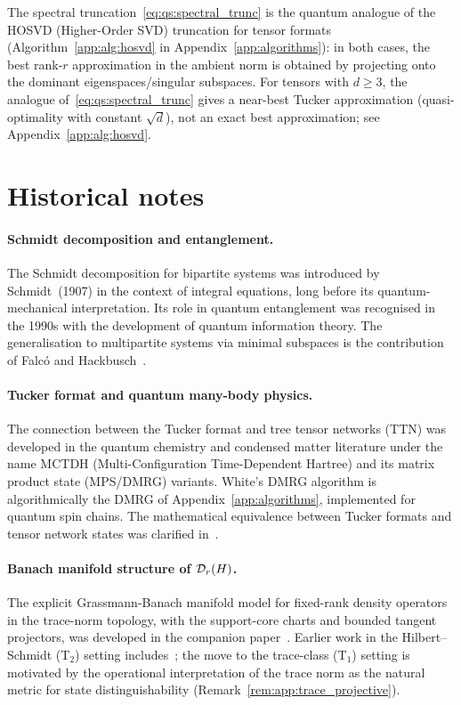 \begin{remark}
\label{rem:qs:ky_fan}
The spectral truncation~\eqref{eq:qs:spectral_trunc} is the quantum
analogue of the HOSVD (Higher-Order SVD) truncation for tensor formats
(Algorithm~\ref{app:alg:hosvd} in Appendix~\ref{app:algorithms}):
in both cases, the best rank-$r$ approximation in the ambient norm is
obtained by projecting onto the dominant eigenspaces/singular subspaces.
For tensors with $d \geq 3$, the analogue of~\eqref{eq:qs:spectral_trunc}
gives a near-best Tucker approximation (quasi-optimality with
constant $\sqrt{d}$), not an exact best approximation; see
Appendix~\ref{app:alg:hosvd}.
\end{remark}

\section{Historical notes}
\label{sec:qs:history}

\paragraph{Schmidt decomposition and entanglement.}
The Schmidt decomposition for bipartite systems was introduced by
Schmidt~(1907) in the context of integral equations, long before its
quantum-mechanical interpretation. Its role in quantum entanglement
was recognised in the 1990s with the development of quantum information
theory. The generalisation to multipartite systems via minimal subspaces
is the contribution of Falcó and Hackbusch~\cite{FH2012}.

\paragraph{Tucker format and quantum many-body physics.}
The connection between the Tucker format and tree tensor networks (TTN)
was developed in the quantum chemistry and condensed matter literature
under the name MCTDH (Multi-Configuration Time-Dependent Hartree) and
its matrix product state (MPS/DMRG) variants. White's DMRG algorithm
\cite{White1992} is algorithmically the DMRG of
Appendix~\ref{app:algorithms}, implemented for quantum spin chains.
The mathematical equivalence between Tucker formats and tensor network
states was clarified in~\cite{Hackbusch2019}.

\paragraph{Banach manifold structure of $\mathcal{D}_{r}(H)$.}
The explicit Grassmann-Banach manifold model for fixed-rank density
operators in the trace-norm topology, with the support-core charts and
bounded tangent projectors, was developed in the companion
paper~\cite{AcevedoFalco2026}. Earlier work in the Hilbert--Schmidt
(T$_2$) setting includes~\cite{KochLubich2007}; the move to the
trace-class (T$_1$) setting is motivated by the operational
interpretation of the trace norm as the natural metric for state
distinguishability (Remark~\ref{rem:app:trace_projective}).
